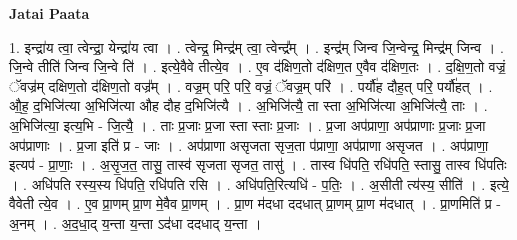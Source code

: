 \documentclass[17pt]{extarticle}
\begin{document}
\textbf{Jatai Paata} \newline

1. इन्द्रा॑य त्वा॒ त्वेन्द्रा॒ येन्द्रा॑य त्वा । . त्वेन्द्र॒ मिन्द्र॑म् त्वा॒ त्वेन्द्र᳚म् । . इन्द्र॑म् जिन्व जि॒न्वेन्द्र॒ मिन्द्र॑म् जिन्व । . जि॒न्वे तीति॑ जिन्व जि॒न्वे ति॑ । . इत्ये॒वैवे तीत्ये॒व । . ए॒व द॑क्षिण॒तो द॑क्षिण॒त ए॒वैव द॑क्षिण॒तः । . द॒क्षि॒ण॒तो वज्रं॒ ॅवज्र॑म् दक्षिण॒तो द॑क्षिण॒तो वज्र᳚म् । . वज्र॒म् परि॒ परि॒ वज्रं॒ ॅवज्र॒म् परि॑ । . पर्यौ॑ह दौह॒त् परि॒ पर्यौ॑हत् । . औ॒ह॒ द॒भिजि॑त्या अ॒भिजि॑त्या औह दौह द॒भिजि॑त्यै । . अ॒भिजि॑त्यै॒ ता स्ता अ॒भिजि॑त्या अ॒भिजि॑त्यै॒ ताः । . अ॒भिजि॑त्या॒ इत्य॒भि - जि॒त्यै॒ । . ताः प्र॒जाः प्र॒जा स्ता स्ताः प्र॒जाः । . प्र॒जा अप॑प्राणा॒ अप॑प्राणाः प्र॒जाः प्र॒जा अप॑प्राणाः । . प्र॒जा इति॑ प्र - जाः । . अप॑प्राणा असृजता सृज॒ता प॑प्राणा॒ अप॑प्राणा असृजत । . अप॑प्राणा॒ इत्यप॑ - प्रा॒णाः॒ । . अ॒सृ॒ज॒त॒ तासु॒ तास्व॑ सृजता सृजत॒ तासु॑ । . तास्व धि॑पति॒ रधि॑पति॒ स्तासु॒ तास्व धि॑पतिः । . अधि॑पति रस्य॒स्य धि॑पति॒ रधि॑पति रसि । . अधि॑पति॒रित्यधि॑ - प॒तिः॒ । . अ॒सीती त्य॑स्य॒ सीति॑ । . इत्ये॒ वैवेती त्ये॒व । . ए॒व प्रा॒णम् प्रा॒ण मे॒वैव प्रा॒णम् । . प्रा॒ण म॑दधा ददधात् प्रा॒णम् प्रा॒ण म॑दधात् । . प्रा॒णमिति॑ प्र - अ॒नम् । . अ॒द॒धा॒द् य॒न्ता य॒न्ता ऽद॑धा ददधाद् य॒न्ता । \newline
\end{document}
